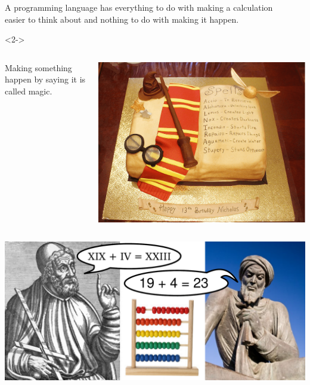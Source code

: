\documentclass[aspectratio=169]{beamer}
\begin{document}
\begin{frame}{}
\large
\vspace{1 cm}
\begin{center}
A programming language has everything to do with making a calculation \\ easier to think about and nothing to do with making it happen.
\end{center}

\vspace{0.5 cm}
\begin{uncoverenv}<2->
\begin{columns}
\begin{center}
Making something happen by saying it is called magic.
\end{center}

\includegraphics[width=\linewidth]{Harry-Potter-Cake.png}
\end{columns}
\end{uncoverenv}
\end{frame}

\begin{frame}{}

\includegraphics[width=\linewidth]{abacus_ptolemy_al-khwarizmi.pdf}

\end{frame}
\end{document}
